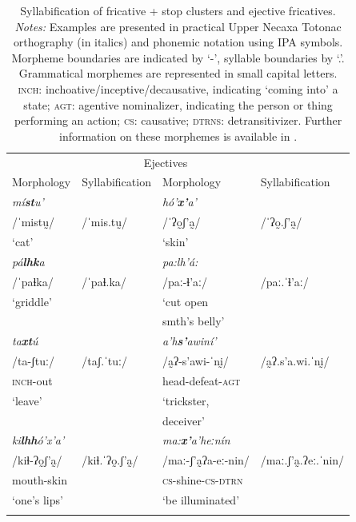 \documentclass[output=paper,colorlinks,citecolor=brown]{langscibook}
\begin{document}
\begin{table}
    \caption[Syllabification of fricative + stop clusters and ejective fricatives]{Syllabification of fricative + stop clusters and ejective fricatives. \textit{Notes:} Examples are presented in practical Upper Necaxa Totonac orthography (in italics) and phonemic notation using IPA symbols. Morpheme boundaries are indicated by `-', syllable boundaries by `.'. Grammatical morphemes are represented in small capital letters. \textsc{inch}: inchoative/inceptive/decausative, indicating `coming into' a state; \textsc{agt}: agentive nominalizer, indicating the person or thing performing an action; \textsc{cs}: causative; \textsc{dtrns}: detransitivizer. Further information on these morphemes is available in \citet{Beck2011}.}
    \label{tab:syllables}
    \begin{tabular}{llll}
		\lsptoprule
			\multicolumn{2}{c}{Clusters} & \multicolumn{2}{c}{Ejectives}\\\cmidrule(lr){1-2}\cmidrule(lr){3-4}
			{Morphology} &{Syllabification}&{Morphology} &{Syllabification}\\\midrule
			\textit{mí\textbf{st}u'} & &\textit{hó'\textbf{x{'}}a'} & \\
			{/ˈmistṵ/}&{/ˈmis.tṵ/}&{/ˈʔo̰ʃ'a̰/}&{/ˈʔo̰.ʃ'a̰/}\\
			`cat' &&`skin'&\\
			\midrule
			\textit{p\'a\textbf{lhk}a} &&\textit{pa:lh’á:}&\\
			{/ˈpa{ɬ}ka/}&{/ˈpa{ɬ}.ka/}&{/paː-{ɬ}'aː/}&{/paː.ˈ{ɬ}'aː/}\\
			`griddle' &&`cut open &\\
			&& smth's belly'&\\
			\midrule
			\textit{ta\textbf{xt}\'u} &&\textit{a'h\textbf{s{'}}awiní'}&\\
			{/ta-ʃtuː/} & {/taʃ.ˈtuː/}&{/a̰ʔ-s'awi-ˈnḭ/}&{/a̰ʔ.s'a.wi.ˈnḭ/}\\
			\textsc{inch}-out & &head-defeat-\textsc{agt} &\\
			`leave'&&`trickster,&\\
			&&deceiver'&\\
			\midrule
			\textit{ki\textbf{lhh}ó'x{'}a'}& &\textit{ma:\textbf{x{'}}a'heːnín}& \\
			{/ki{ɬ}-ʔo̰ʃ'a̰/}&{/ki{ɬ}.ˈʔo̰.ʃ'a̰/}&{/maː-ʃ'a̰ʔa-eː-nin/}&{/maː.ʃ'a̰.ʔeː.ˈnin/}\\
			mouth-skin & &\textsc{cs}-shine-\textsc{cs}-\textsc{dtrn}&\\
			`one's lips' & &`be illuminated'&\\
			\lspbottomrule
		\end{tabular}
	\end{table}
\end{document}
